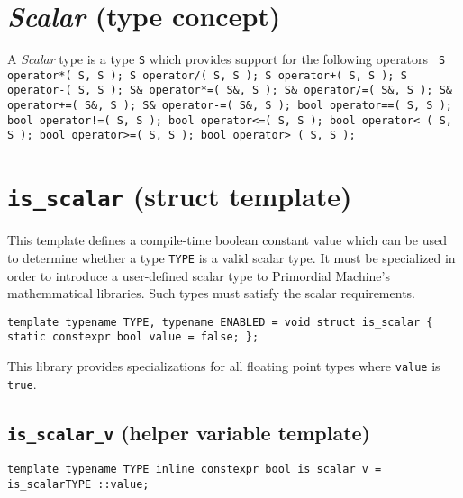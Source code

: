 \documentclass[oneside]{book}
\begin{document}
\section{\textit{Scalar} (type concept)}
A \textit{Scalar} type is a type \texttt{S} which provides support for the following operators\newline
\texttt{
S operator*( S, S );\newline
S operator/( S, S );\newline
S operator+( S, S );\newline
S operator-( S, S );\newline
\newline
S\& operator*=( S\&, S );\newline
S\& operator/=( S\&, S );\newline
S\& operator+=( S\&, S );\newline
S\& operator-=( S\&, S );\newline
\newline
bool operator==( S, S );\newline
bool operator!=( S, S );\newline
bool operator<=( S, S );\newline
bool operator< ( S, S );\newline
bool operator>=( S, S );\newline
bool operator> ( S, S );}

\section{\texttt{is\_scalar} (struct template)}
This template defines a compile-time boolean constant value which can be used to
determine whether a type \texttt{TYPE} is a valid scalar type. It must        be
specialized in order to introduce a user-defined scalar type to       Primordial
Machine's mathemmatical libraries. Such types must satisfy the            scalar
requirements.\newline

\texttt{template \textlangle typename TYPE, typename ENABLED = void\textrangle\newline
struct is\_scalar \{\newline
\hspace*{2em}static constexpr bool value = false;\newline
\};}\newline

This library provides specializations for all floating point    types
where \texttt{value} is \texttt{true}.

\subsection{\texttt{is\_scalar\_v} (helper variable template)}
\texttt{template \textlangle typename TYPE\textrangle\newline
inline constexpr bool is\_scalar\_v = is\_scalar\textlangle TYPE \textrangle::value;}
\end{document}
